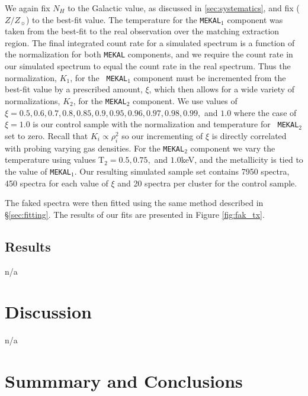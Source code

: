 \documentclass[12pt, preprint]{aastex}
\begin{document}
We again fix $N_H$ to the Galactic value, as discussed in \ref{sec:systematics}, and fix
($Z/Z_{\sun}$) to the best-fit value. The
temperature for the {\tt MEKAL$_{1}$} component was taken from the
best-fit to the real observation over the matching extraction
region. The final integrated count rate for a simulated spectrum
is a function of the normalization for both {\tt MEKAL} components,
and we require the count rate in our simulated spectrum to equal
the count rate in the real spectrum. Thus the normalization, $K_1$, for the {\tt
MEKAL$_{1}$} component must be incremented from the best-fit value by a
prescribed amount, $\xi$, which then allows for a wide variety of
normalizations, $K_2$, for the {\tt MEKAL$_2$} component. We use
values of $\xi = 0.5, 0.6, 0.7, 0.8, 0.85, 0.9, 0.95, 0.96, 0.97,
0.98, 0.99,$ and $1.0$ where the case of $\xi=1.0$ is our
control sample with the normalization and temperature for {\tt
MEKAL$_2$} set to zero. Recall that
$K_i \propto \rho_{i}^2$ so our incrementing of $\xi$ is directly
correlated with probing varying gas densities. For the {\tt MEKAL$_2$} component we vary
the temperature using values T$_2 = 0.5, 0.75, $ and $1.0$keV,
and the metallicity is tied to the value of {\tt MEKAL$_1$}. Our
resulting simulated sample set contains 7950 spectra, 450 spectra for each
value of $\xi$ and 20 spectra per cluster for the control sample.

The faked spectra were then fitted using the same method described in
\S\ref{sec:fitting}. The results of our fits are presented in Figure
\ref{fig:fak_tx}. 


\subsection{Results} \label{sec:simresults}

n/a

\section{Discussion}\label{sec:discussion}

n/a

\section{Summmary and Conclusions}\label{sec:summary}
\end{document}
